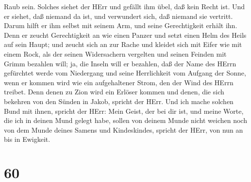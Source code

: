 Raub sein. Solches siehet der HErr und gefällt ihm übel, daß kein Recht
ist.  Und er siehet, daß niemand da ist, und verwundert
sich, daß niemand sie vertritt. Darum hilft er ihm selbst mit seinem
Arm, und seine Gerechtigkeit erhält ihn.  Denn er zeucht
Gerechtigkeit an wie einen Panzer und setzt einen Helm des Heils auf
sein Haupt; und zeucht sich an zur Rache und kleidet sich mit Eifer wie
mit einem Rock,  als der seinen Widersachern vergelten und
seinen Feinden mit Grimm bezahlen will; ja, die Inseln will er bezahlen,
 daß der Name des HErrn gefürchtet werde vom Niedergang und
seine Herrlichkeit vom Aufgang der Sonne, wenn er kommen wird wie ein
aufgehaltener Strom, den der Wind des HErrn treibet.  Denn
denen zu Zion wird ein Erlöser kommen und denen, die sich bekehren von
den Sünden in Jakob, spricht der HErr.  Und ich mache
solchen Bund mit ihnen, spricht der HErr: Mein Geist, der bei dir ist,
und meine Worte, die ich in deinen Mund gelegt habe, sollen von deinem
Munde nicht weichen noch von dem Munde deines Samens und Kindeskindes,
spricht der HErr, von nun an bis in Ewigkeit.

\hypertarget{section-59}{%
\section{60}\label{section-59}}


